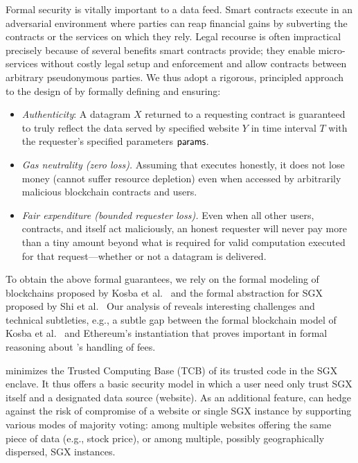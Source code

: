 \vspace{2mm}
Formal security is vitally important to a data feed.
Smart contracts execute in an adversarial environment where parties can reap financial gains by subverting the contracts or the services on which they rely.
Legal recourse is often impractical precisely because of several benefits smart contracts provide;
they enable micro-services without costly legal setup and enforcement and allow contracts between arbitrary pseudonymous parties.
We thus adopt a rigorous, principled approach to the design of \tcs by formally defining and ensuring: 

\begin{itemize}[leftmargin=5mm]
\item
  \setlength{\itemsep}{2pt}
  \setlength{\parskip}{0pt}
  \setlength{\parsep}{0pt}
{\it Authenticity}: A datagram $X$ returned
to a requesting contract is guaranteed
to truly reflect the data served by specified website $Y$ in time interval $T$ with the requester's specified parameters ${\sf params}$.
\item
{\it Gas neutrality (zero \tc loss).} Assuming that \tc executes honestly, it does not lose money (cannot suffer resource depletion)
even when accessed by arbitrarily malicious blockchain contracts and users.
\item
{\it Fair expenditure (bounded requester loss).} 
Even when all other users, contracts, and \tc itself act maliciously, 
an honest requester will never pay more than a tiny amount beyond what is required for valid computation executed for that request---whether or not a datagram is delivered.
\end{itemize}
\vspace{-1mm}

To obtain the above formal guarantees,
we rely on the formal modeling 
of blockchains proposed by Kosba et al.~\cite{hawk} and the formal abstraction for SGX proposed by Shi et al.~\cite{sgxsok}
Our analysis of \tc reveals interesting challenges and technical subtleties, e.g., 
a subtle gap between the formal blockchain model
of Kosba et al.~\cite{hawk}
and Ethereum's instantiation  
that proves important in formal reasoning about \tc's handling of fees. 

\vspace{2mm}
\tc minimizes the Trusted Computing Base (TCB) of its trusted code in the SGX enclave.
It thus offers a basic security model in which a user need only trust SGX itself and a designated data source (website).
As an additional feature, \tc can hedge against the risk of compromise of a website or single SGX instance
by supporting various modes of majority voting:
among multiple 
websites offering the same piece of data (e.g., stock price),  
or among multiple, possibly geographically dispersed, SGX instances.

